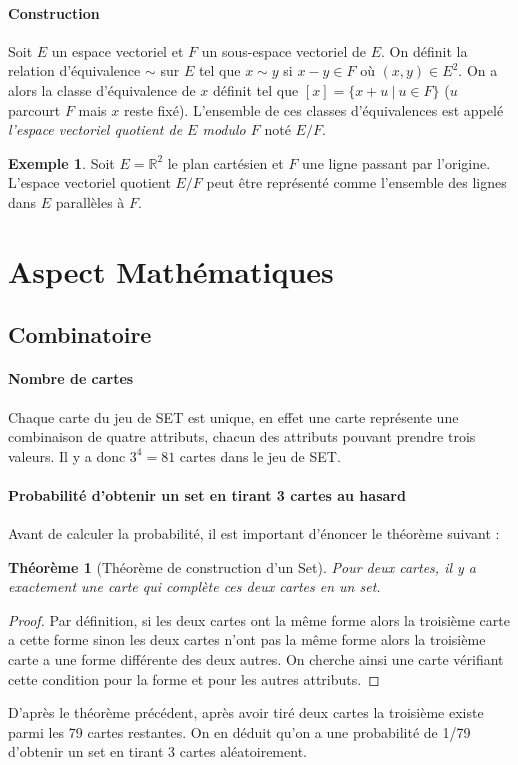\documentclass[a4paper,12pt,titlepage]{article}
\theoremstyle{plain}
\newtheorem{thm}{Théorème}
\theoremstyle{definition}
\newtheorem{ex}{Exemple}
\begin{document}
\paragraph{Construction}
Soit $E$ un espace vectoriel et $F$ un sous-espace vectoriel de $E$. On définit la relation d'équivalence $\sim$ sur $E$ tel que $x \sim y$ si $x - y \in F$ où $(x,y)\in E^2$. On a alors la classe d'équivalence de $x$ définit tel que $[x] = \{x + u~|~u \in F\}$ ($u$ parcourt $F$ mais $x$ reste fixé). L'ensemble de ces classes d'équivalences est appelé \emph{l'espace vectoriel quotient de $E$ modulo $F$} noté $E/F$.
\begin{ex}
Soit $E = \mathbb{R}^2$ le plan cartésien et $F$ une ligne passant par l'origine.
L'espace vectoriel quotient $E/F$ peut être représenté comme l'ensemble des lignes dans $E$ parallèles à $F$.
\end{ex}

\newpage


\section{Aspect Mathématiques}
\subsection{Combinatoire}

\paragraph{Nombre de cartes} Chaque carte du jeu de SET est unique, en effet une carte représente une combinaison de quatre attributs, chacun des attributs pouvant prendre trois valeurs. 
Il y a donc $3^4=81$ cartes dans le jeu de SET.

\paragraph{Probabilité d'obtenir un set en tirant 3 cartes au hasard} Avant de calculer la probabilité, il est important d'énoncer le théorème suivant :

\begin{thm}[Théorème de construction d'un Set]\label{thm:Construction}
  Pour deux cartes, il y a exactement une carte qui complète ces deux cartes en un set.
\end{thm}
\begin{proof}
  Par définition, si les deux cartes ont la même forme alors la troisième carte a cette forme sinon les deux cartes n'ont pas la même forme alors la troisième carte a une forme différente des deux autres. On cherche ainsi une carte vérifiant cette condition pour la forme et pour les autres attributs.
\end{proof}
D'après le théorème précédent, après avoir tiré deux cartes la troisième existe parmi les 79 cartes restantes. On en déduit qu'on a une probabilité de 1/79 d'obtenir un set en tirant 3 cartes aléatoirement.
\end{document}
